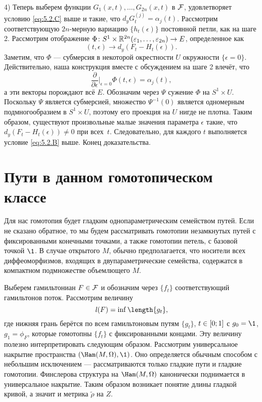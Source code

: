 4) Теперь выберем функции $G_1(x,t),\dots, G_{2n}(x,t)$ в $\mathcal{F}$, удовлетворяет условию \ref{eq:5.2.C} выше и такие, что $d_y G_t^{(j)} = \alpha_j (t)$.
Рассмотрим соответствующую $2n$-мерную вариацию $\{h_t (\epsilon)\}$ постоянной петли, как на шаге 2.
Рассмотрим отображение $\Phi\colon S^1 \times \mathbb{R}^{2n} (\varepsilon_1 ,\dots, \varepsilon_{2n}) \to E$, определенное как 
\[(t, \epsilon) \to d_y (F_t - H_t (\epsilon)).\]
Заметим, что $\Phi$ --- субмерсия в некоторой окрестности $U$ окружности $\{\epsilon = 0\}$.
Действительно, наша конструкция вместе с обсуждением на шаге 2 влечёт, что 
\[\frac{\partial}{\partial\epsilon}|_{\epsilon = 0} \Phi (t, \epsilon) = \alpha_j (t),\]
а эти векторы порождают всё $E$.
Обозначим через $\Psi$ сужение $\Phi$ на $S^1 \times U$.
Поскольку $\Psi$ является субмерсией, множество $\Psi^{-1} (0)$ является одномерным подмногообразием в $S^1 \times U$, поэтому его проекция на $U$ нигде не плотна.
Таким образом, существуют произвольные малые значения параметра $\epsilon$ такие, что $d_y (F_t - H_t (\epsilon)) \ne 0$ при всех~$t$.
Следовательно, для каждого $t$ выполняется условие \ref{eq:5.2.B} выше.
Конец доказательства.
\qeds

\section{Пути в данном гомотопическом классе}\label{5.3}

Для нас гомотопия будет гладким однопараметрическим семейством путей.
Если не сказано обратное, то мы будем рассматривать гомотопии незамкнутых путей с фиксированными конечными точками, а также гомотопии петель, с базовой точкой $\1$.
В случае открытого $M$, обычно предполагается, что носители всех диффеоморфизмов, входящих в двупараметрические семейства, содержатся в компактном подмножестве объемлющего $M$.

Выберем гамильтониан $F \in \mathcal{F}$ и обозначим через $\{f_t\}$ соответствующий гамильтонов поток.
Рассмотрим величину \[\l(F) = \inf \length \{g_t\},\] где нижняя грань берётся по всем гамильтоновым путям $\{g_t\}$, $t \z\in [0; 1]$ с $g_0 = \1$, $g_1 = \phi_F$, которые гомотопны $\{f_t\}$ с фиксированными концами.
Эту величину полезно интерпретировать следующим образом.
Рассмотрим универсальное накрытие  пространства $(\Ham (M, \Omega), \1)$.
Оно определяется обычным способом с небольшим исключением --- рассматриваются только гладкие пути и гладкие гомотопии.
Финслерова структура на $\Ham (M, \Omega)$ канонически поднимается в универсальное накрытие.
Таким образом возникает понятие длины гладкой кривой, а значит и метрика $\tilde\rho$ на $Z$.

